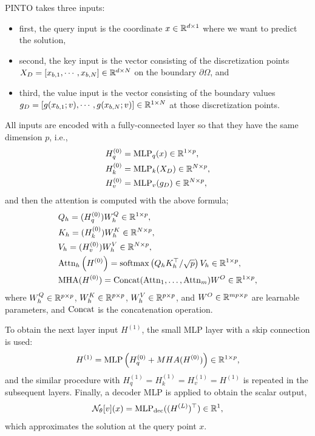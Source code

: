 PINTO takes three inputs:
\begin{itemize}
  \item first, the query input is the coordinate $x\in \mathbb{R}^{d\times 1}$ 
  where we want to predict the solution,
  \item second, the key input is the vector consisting of the discretization points 
  $X_D = [x_{b, 1}, \cdots, x_{b, N}] \in \mathbb{R}^{d \times N}$ 
  on the boundary $\partial \Omega$, and
  \item third, the value input is the vector consisting of the boundary values 
  $g_D = [g(x_{b, 1}; v), \cdots, g(x_{b, N}; v)] \in \mathbb{R}^{1 \times N}$ 
  at those discretization points.
\end{itemize} 
All inputs are encoded with a fully-connected layer so that they have the same dimension $p$,
i.e., 
\begin{align*}
  H_q^{(0)} &= \text{MLP}_q(x) \in \mathbb{R}^{1 \times p}, \\
  H_k^{(0)} &= \text{MLP}_k(X_D) \in \mathbb{R}^{N\times p}, \\
  H_v^{(0)} &= \text{MLP}_v(g_D) \in \mathbb{R}^{N\times p},
\end{align*}
and then the attention is computed with the above formula;
\begin{align*}
  &Q_h = (H_q^{(0)}) W_h^Q \in \mathbb{R}^{1 \times p}, \\ 
  &K_h = (H_{k}^{(0)}) W_h^K \in \mathbb{R}^{N \times p}, \\
  &V_h = (H_{v}^{(0)}) W_h^V \in \mathbb{R}^{N \times p}, \\
  &\text{Attn}_h \left(H^{(0)}\right) = \text{softmax}\left(Q_h K_h^\top / \sqrt{p}\right) V_h \in \mathbb{R}^{1 \times p}, \\
  &\mathrm{MHA}(H^{(0)}) = \mathrm{Concat}(\mathrm{Attn}_1, \ldots, \mathrm{Attn}_m) W^O \in \mathbb{R}^{1\times p},
\end{align*}
where $W_h^Q \in \mathbb{R}^{p \times p}$, $W_h^K \in \mathbb{R}^{p \times p}$, $W_h^V \in \mathbb{R}^{p \times p}$, and $W^O \in \mathbb{R}^{mp \times p}$ are learnable parameters, and $\text{Concat}$ is the concatenation operation.

To obtain the next layer input $H^{(1)}$, the small MLP layer with a skip connection is used:
\[ H^{(1)} = \text{MLP}\left(H_q^{(0)} + MHA(H^{(0)})\right) \in \mathbb{R}^{1 \times p},\]
and the similar procedure with $H_q^{(1)} = H_k^{(1)} = H_v^{(1)} = H^{(1)}$ is
repeated in the subsequent layers.
Finally, a decoder MLP is applied to obtain the scalar output,
\[ \mathcal{N}_\theta[v](x) = \text{MLP}_{\text{dec}}((H^{(L)})^\top) \in \mathbb{R}^{1}, \]
which approximates the solution at the query point $x$. 

